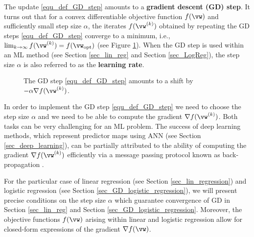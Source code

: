 \documentclass[12pt]{report}
\begin{document}
The update \eqref{equ_def_GD_step} amounts to a {\bf gradient descent (GD) step}. It turns out that for a convex differentiable 
objective function $f(\vw)$ and sufficiently small step size $\alpha$, the iterates $f(\vw^{(k)})$ obtained by repeating 
the GD steps \eqref{equ_def_GD_step} converge to a minimum, i.e., $\lim_{k \rightarrow \infty} f(\vw^{(k)}) = f(\vw_{\rm opt})$ (see Figure \ref{fig_basic_GD_step}). 
When the GD step is used within an ML method (see Section \ref{sec_lin_reg} and Section \ref{sec_LogReg}), the step size $\alpha$ is also referred to 
as the {\bf learning rate}. 

\begin{figure}
\begin{center}
\end{center}
\caption{The GD step \eqref{equ_def_GD_step} amounts to a shift by $-\alpha \nabla f(\vw^{(k)})$.}
\label{fig_basic_GD_step}
\end{figure}

In order to implement the GD step \eqref{equ_def_GD_step} we need to choose the step size 
$\alpha$ and we need to be able to compute the gradient $\nabla f(\vw^{(k)})$. Both tasks can 
be very challenging for an ML problem. The success of deep learning methods, which represent 
predictor maps using ANN (see Section \ref{sec_deep_learning}), can be partially attributed to 
the ability of computing the gradient $\nabla f(\vw^{(k)})$ efficiently via a message passing protocol 
known as back-propagation \cite{Goodfellow-et-al-2016}. 

For the particular case of linear regression (see Section \ref{sec_lin_regression}) and logistic 
regression (see Section \ref{sec_GD_logistic_regression}), we will present precise conditions 
on the step size $\alpha$ which guarantee convergence of GD in Section \ref{sec_lin_reg} and 
Section \ref{sec_GD_logistic_regression}. Moreover, the objective functions $f(\vw)$ arising 
within linear and logistic regression allow for closed-form expressions of the gradient $\nabla f(\vw)$.
\end{document}
